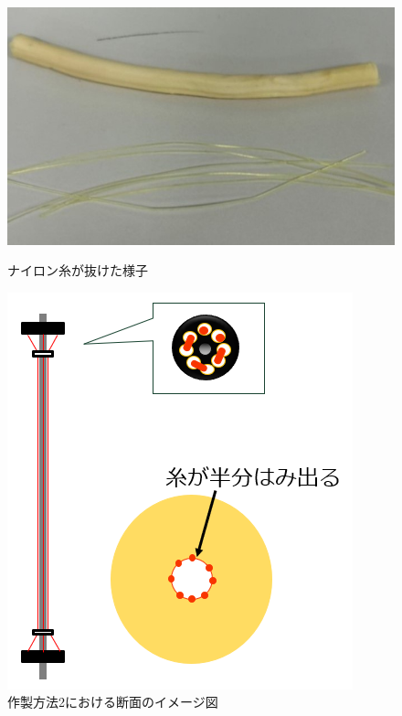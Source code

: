 \begin{figure}[htbp]
  \centering
  \begin{minipage}[b]{0.49\hsize}
      \centering
      \includegraphics[scale=0.3]{pic/20.jpg}
      \caption{ナイロン糸が抜けた様子}
       \label{fig:22}
  \end{minipage} \hfill
  \begin{minipage}[b]{0.49\hsize}
      \centering
      \includegraphics[scale=0.5]{pic/21.PNG}
      \caption{作製方法2における断面のイメージ図}
      \label{fig:23}
  \end{minipage} 
\end{figure}


\newpage
